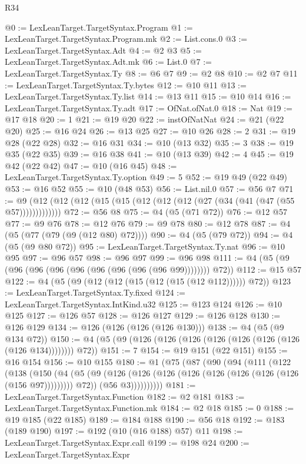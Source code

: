 \begin{lexlean}{R34}
\begin{coremodule}
@0 := LexLeanTarget.TargetSyntax.Program
@1 := LexLeanTarget.TargetSyntax.Program.mk
@2 := List.cons.{0}
@3 := LexLeanTarget.TargetSyntax.Adt
@4 := @2 @3
@5 := LexLeanTarget.TargetSyntax.Adt.mk
@6 := List.{0}
@7 := LexLeanTarget.TargetSyntax.Ty
@8 := @6 @7
@9 := @2 @8
@10 := @2 @7
@11 := LexLeanTarget.TargetSyntax.Ty.bytes
@12 := @10 @11
@13 := LexLeanTarget.TargetSyntax.Ty.list
@14 := @13 @11
@15 := @10 @14
@16 := LexLeanTarget.TargetSyntax.Ty.adt
@17 := OfNat.ofNat.{0}
@18 := Nat
@19 := @17 @18
@20 := 1
@21 := @19 @20
@22 := instOfNatNat
@24 := @21 (@22 @20)
@25 := @16 @24
@26 := @13 @25
@27 := @10 @26
@28 := 2
@31 := @19 @28 (@22 @28)
@32 := @16 @31
@34 := @10 (@13 @32)
@35 := 3
@38 := @19 @35 (@22 @35)
@39 := @16 @38
@41 := @10 (@13 @39)
@42 := 4
@45 := @19 @42 (@22 @42)
@47 := @10 (@16 @45)
@48 := LexLeanTarget.TargetSyntax.Ty.option
@49 := 5
@52 := @19 @49 (@22 @49)
@53 := @16 @52
@55 := @10 (@48 @53)
@56 := List.nil.{0}
@57 := @56 @7
@71 := @9 (@12 (@12 (@12 (@15 (@15 (@12 (@12 (@12 (@27 (@34 (@41 (@47 (@55 @57)))))))))))))
@72 := @56 @8
@75 := @4 (@5 (@71 @72))
@76 := @12 @57
@77 := @9 @76
@78 := @12 @76
@79 := @9 @78
@80 := @12 @78
@87 := @4 (@5 (@77 (@79 (@9 (@12 @80) @72))))
@90 := @4 (@5 (@79 @72))
@94 := @4 (@5 (@9 @80 @72))
@95 := LexLeanTarget.TargetSyntax.Ty.nat
@96 := @10 @95
@97 := @96 @57
@98 := @96 @97
@99 := @96 @98
@111 := @4 (@5 (@9 (@96 (@96 (@96 (@96 (@96 (@96 (@96 (@96 @99)))))))) @72))
@112 := @15 @57
@122 := @4 (@5 (@9 (@12 (@12 (@15 (@12 (@15 (@12 @112)))))) @72))
@123 := LexLeanTarget.TargetSyntax.Ty.fixed
@124 := LexLeanTarget.TargetSyntax.IntKind.u32
@125 := @123 @124
@126 := @10 @125
@127 := @126 @57
@128 := @126 @127
@129 := @126 @128
@130 := @126 @129
@134 := @126 (@126 (@126 (@126 @130)))
@138 := @4 (@5 (@9 @134 @72))
@150 := @4 (@5 (@9 (@126 (@126 (@126 (@126 (@126 (@126 (@126 (@126 @134)))))))) @72))
@151 := 7
@154 := @19 @151 (@22 @151)
@155 := @16 @154
@156 := @10 @155
@180 := @1
    (@75
      (@87
        (@90
          (@94
            (@111
              (@122
                (@138
                  (@150
                    (@4
                      (@5
                        (@9 (@126 (@126 (@126 (@126 (@126 (@126 (@126 (@126 (@156 @97))))))))) @72))
                      (@56 @3))))))))))
@181 := LexLeanTarget.TargetSyntax.Function
@182 := @2 @181
@183 := LexLeanTarget.TargetSyntax.Function.mk
@184 := @2 @18
@185 := 0
@188 := @19 @185 (@22 @185)
@189 := @184 @188
@190 := @56 @18
@192 := @183 (@189 @190)
@197 := @192 (@10 (@16 @188) @57) @11
@198 := LexLeanTarget.TargetSyntax.Expr.call
@199 := @198 @24
@200 := LexLeanTarget.TargetSyntax.Expr

\end{coremodule}
\end{lexlean}
